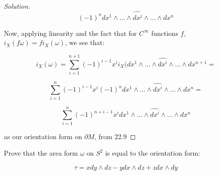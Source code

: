 \documentclass[10pt]{article}
\theoremstyle{nonumberplain}%
\newenvironment{problem}[2][]{\begin{trivlist}
\item[\hskip \labelsep {\bfseries #1}\hskip \labelsep {\bfseries #2.}]}{\end{trivlist}}
\begin{document}
\begin{proof}[Solution]
$$ (-1)^n dx^1 \wedge \dots \wedge \widehat{dx^j} \wedge ... \wedge dx^n $$

Now, applying linearity and the fact that for $C^\infty$ functions $f$, $i_X(f \omega) = f i_X(\omega)$, we see that:

$$i_X(\omega) = \sum_{i=1}^{n+1} (-1)^{i-1} x^i i_X(dx^1 \wedge \dots \wedge \widehat{dx^i} \wedge \dots \wedge dx^{n+1} = $$

$$ \sum_{i=1}^{n} (-1)^{i-1} x^i (-1)^n dx^1 \wedge \dots \wedge \widehat{dx^i} \wedge \dots \wedge dx^n = $$

$$ \sum_{i=1}^{n} (-1)^{n + i-1} x^i dx^1 \wedge \dots \wedge \widehat{dx^i} \wedge \dots \wedge dx^n $$

as our orientation form on $\partial M$, from 22.9





\end{proof}



\begin{problem}{Question 6}

Prove that the area form $\omega$ on $S^2$ is equal to the orientation form:

$$\tau =  x dy \wedge dz -y dx \wedge dz + z dx \wedge dy $$

\end{problem}
\end{document}
